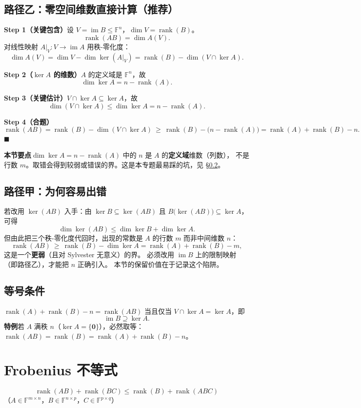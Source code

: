 \documentclass[11pt]{ctexart}
\newcommand{\rank}{\operatorname{rank}}
\newcommand{\im}{\operatorname{im}}
\newcommand{\F}{\mathbb{F}}
\begin{document}
\subsection{路径乙：零空间维数直接计算（推荐）}

\textbf{Step 1（关键包含）}\quad 设 $V=\im B\le\F^n$，$\dim V=\rank(B)$。
\[
\rank(AB)=\dim A(V).
\]
对线性映射 $A|_V:V\to\im A$ 用秩-零化度：
\[
\dim A(V)=\dim V-\dim\ker(A|_V)=\rank(B)-\dim(V\cap\ker A).
\]

\textbf{Step 2（$\ker A$ 的维数）}\quad $A$ 的定义域是 $\F^n$，故
\[
\dim\ker A=n-\rank(A).
\]

\textbf{Step 3（关键估计）}\quad $V\cap\ker A\subseteq\ker A$，故
\[
\dim(V\cap\ker A)\le\dim\ker A=n-\rank(A).
\]

\textbf{Step 4（合题）}\quad
\[
\rank(AB)=\rank(B)-\dim(V\cap\ker A)\ \ge\ \rank(B)-\bigl(n-\rank(A)\bigr)
=\rank(A)+\rank(B)-n .
\]
\hfill$\blacksquare$

\begin{warnbox}
\textbf{本节要点}\quad $\dim\ker A=n-\rank(A)$ 中的 $n$ 是 $A$ 的\textbf{定义域}维数（列数），
不是行数 $m$。取错会得到较弱或错误的界。这是本专题最易踩的坑，见 \S\ref{sec:pitfall2}。
\end{warnbox}

\subsection{路径甲：为何容易出错}\label{sec:pitfall2}
若改用 $\ker(AB)$ 入手：由 $\ker B\subseteq\ker(AB)$ 且
$B\bigl(\ker(AB)\bigr)\subseteq\ker A$，可得
\[
\dim\ker(AB)\le\dim\ker B+\dim\ker A .
\]
但由此把三个秩-零化度代回时，出现的常数是 $A$ 的行数 $m$ 而非中间维数 $n$：
\[
\rank(AB)\ \ge\ \rank(B)-\dim\ker A=\rank(A)+\rank(B)-m ,
\]
这是一个\textbf{更弱}（且对 Sylvester 无意义）的界。
必须改用 $\im B$ 上的限制映射（即路径乙），才能把 $n$ 正确引入。
本节的保留价值在于记录这个陷阱。

\subsection{等号条件}
$\rank(A)+\rank(B)-n=\rank(AB)$ 当且仅当 $V\cap\ker A=\ker A$，即
\[
\im B\supseteq\ker A .
\]
\textbf{特例}\quad 若 $A$ 满秩 $n$（$\ker A=\{\mathbf 0\}$），必然取等：
$\rank(AB)=\rank(B)=\rank(A)+\rank(B)-n$。

\section{Frobenius 不等式}
\[
\boxed{\ \rank(AB)+\rank(BC)\le\rank(B)+\rank(ABC)\ }
\]
（$A\in\F^{m\times n}$，$B\in\F^{n\times p}$，$C\in\F^{p\times q}$）
\end{document}
